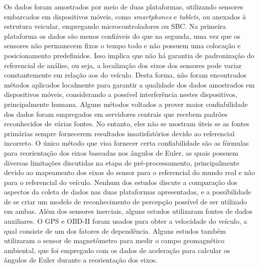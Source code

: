 Os dados foram amostrados por meio de duas plataformas, utilizando sensores embarcados em dispositivos móveis, como \textit{smartphones} e \textit{tablets}, ou anexados à estrutura veicular, empregando microcontroladores ou SBC. Na primeira plataforma os dados são menos confiáveis do que na segunda, uma vez que os sensores não permanecem fixos o tempo todo e não possuem uma colocação e posicionamento predefinidos. Isso implica que não há garantia de padronização do referencial de análise, ou seja, a localização dos eixos dos sensores pode variar constantemente em relação aos do veículo. Desta forma, não foram encontrados métodos aplicados localmente para garantir a qualidade dos dados amostrados em dispositivos móveis, considerando a possível interferência nestes dispositivos, principalmente humana. Alguns métodos voltados a prover maior confiabilidade dos dados foram empregados em servidores centrais que recebem padrões reconhecidos de várias fontes. No entanto, eles não se mostram úteis se as fontes primárias sempre fornecerem resultados insatisfatórios devido ao referencial incorreto. O único método que visa fornecer certa confiabilidade são as fórmulas para reorientação dos eixos baseadas nos ângulos de Euler, as quais possuem diversas limitações discutidas na etapa de pré-processamento, principalmente devido ao mapeamento dos eixos do sensor para o referencial do mundo real e não para o referencial do veículo. Nenhum dos estudos discute a comparação dos aspectos da coleta de dados nas duas plataformas apresentadas, e a possibilidade de se criar um modelo de reconhecimento de percepção possível de ser utilizado em ambas. Além dos sensores inerciais, alguns estudos utilizaram fontes de dados auxiliares. O GPS e OBD-II foram usados para obter a velocidade do veículo, a qual consiste de um dos fatores de dependência. Alguns estudos também utilizaram o sensor de magnetômetro para medir o campo geomagnético ambiental, que foi empregado com os dados de aceleração para calcular os ângulos de Euler durante a reorientação dos eixos. 

